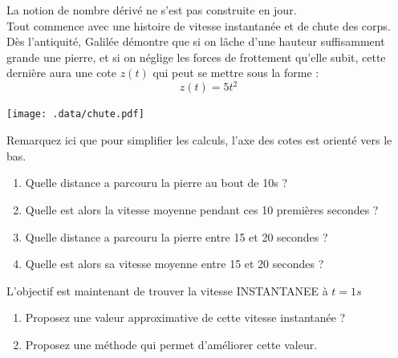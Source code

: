 \documentclass[11pt]{article}
\begin{document}
\begin{exercice}
La notion de nombre dérivé ne s’est pas construite en jour. \\
Tout commence avec une histoire de vitesse instantanée et de chute des corps.\\
Dès l’antiquité, Galilée démontre que si on lâche d’une hauteur suffisamment grande une pierre, et si on néglige les forces de frottement qu’elle subit, cette dernière aura une cote $z(t)$ qui peut se mettre sous la forme :\\
$$z(t)=5t^2$$

\begin{center}
\texttt{[image: .data/chute.pdf]}
\end{center}
Remarquez ici que pour simplifier les calculs, l’axe des cotes est orienté vers le bas.
\begin{enumerate}
\item Quelle distance a parcouru la pierre au bout de 10s ?
\item Quelle est alors la vitesse moyenne pendant ces 10 premières
  secondes ?
\item Quelle distance a parcouru la pierre entre 15 et 20 secondes ?
\item Quelle est alors sa vitesse moyenne entre 15 et 20 secondes ?
\end{enumerate}
L’objectif est maintenant de trouver la vitesse INSTANTANEE à $t=1s$
\begin{enumerate}[resume]
\item Proposez une valeur approximative de cette vitesse instantanée ?
\item Proposez une méthode qui permet d’améliorer cette valeur.
\end{enumerate}
\end{exercice}
\end{document}
